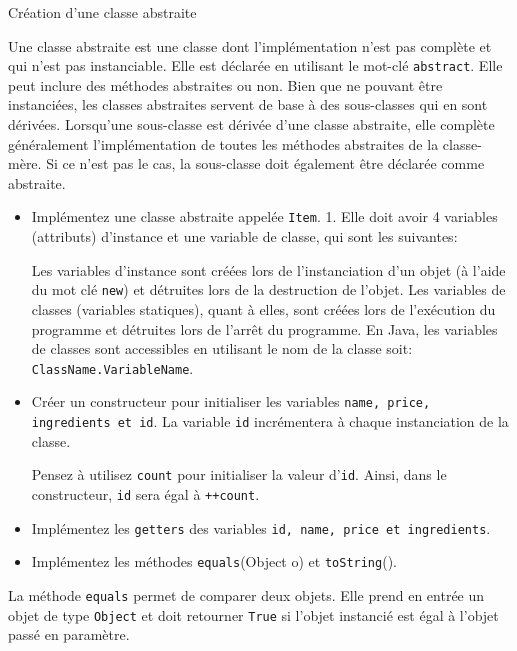 \begin{Exercice}[10 minutes]{Création d'une classe abstraite}

Une classe abstraite est une classe dont l'implémentation n'est pas complète et qui n'est pas instanciable. Elle est déclarée en utilisant le mot-clé \lstinline{abstract}. Elle peut inclure des méthodes abstraites ou non. Bien que ne pouvant être instanciées, les classes abstraites servent de base à des sous-classes qui en sont dérivées.
Lorsqu'une sous-classe est dérivée d'une classe abstraite, elle complète généralement l'implémentation de toutes les méthodes abstraites de la classe-mère. Si ce n'est pas le cas, la sous-classe doit également être déclarée comme abstraite.

 

\begin{itemize}
    \item Implémentez une classe abstraite appelée \lstinline{Item}.
    1. Elle doit avoir 4 variables (attributs) d'instance et une variable de classe, qui sont les suivantes:
     
    \begin{conseil}
        Les variables d'instance sont créées lors de l'instanciation d'un objet (à l'aide du mot clé \lstinline{new}) et détruites lors de la destruction de l'objet. Les variables de classes (variables statiques), quant à elles, sont créées lors de l'exécution du programme et détruites lors de l'arrêt du programme. En Java, les variables de classes sont accessibles en utilisant le nom de la classe soit: \lstinline{ClassName.VariableName}.
    \end{conseil}
    \item Créer un constructeur pour initialiser les variables \lstinline{name, price, ingredients et id}. La variable \lstinline{id} incrémentera à chaque instanciation de la classe.
    \begin{conseil}
        Pensez à utilisez \lstinline{count} pour initialiser la valeur d'\lstinline{id}. Ainsi, dans le constructeur, \lstinline{id} sera égal à \lstinline{++count}.
    \end{conseil}
    \item Implémentez les \lstinline{getters} des variables \lstinline{id, name, price et ingredients}.
    \item Implémentez les méthodes \lstinline{equals}(Object o) et \lstinline{toString}().
\end{itemize}
\begin{conseil}
La méthode \lstinline{equals} permet de comparer deux objets. Elle prend en entrée un objet de type \lstinline{Object} et doit retourner \lstinline{True} si l'objet instancié est égal à l'objet passé en paramètre.
\end{conseil}
    \begin{solution}  
         
    \end{solution}
\end{Exercice}


